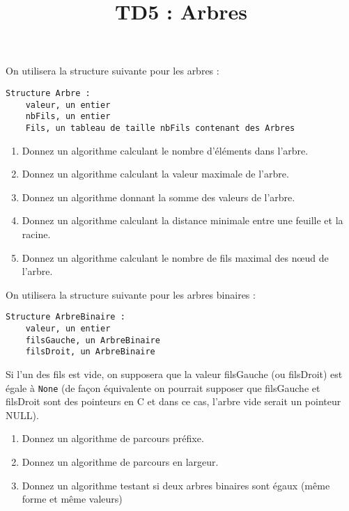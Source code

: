 \documentclass{../cours}
\title{TD5 : Arbres}
\begin{document}
\maketitle


\begin{exercice}[Arbres]

On utilisera la structure suivante pour les arbres :

\begin{lstlisting}
Structure Arbre :
    valeur, un entier
    nbFils, un entier
    Fils, un tableau de taille nbFils contenant des Arbres
\end{lstlisting}

\begin{enumerate}
\item Donnez un algorithme calculant le nombre d'éléments dans l'arbre.
\item Donnez un algorithme calculant la valeur maximale de l'arbre.
\item Donnez un algorithme donnant la somme des valeurs de l'arbre.
\item Donnez un algorithme calculant la distance minimale entre une feuille et la racine.
\item Donnez un algorithme calculant le nombre de fils maximal des nœud de l'arbre.
\end{enumerate}

\end{exercice}

\begin{exercice}

On utilisera la structure suivante pour les arbres binaires :

\begin{lstlisting}
Structure ArbreBinaire :
    valeur, un entier
    filsGauche, un ArbreBinaire
    filsDroit, un ArbreBinaire
\end{lstlisting}

Si l'un des fils est vide, on supposera que la valeur filsGauche (ou filsDroit) est égale à \texttt{None} (de façon équivalente on pourrait supposer que filsGauche et filsDroit sont des pointeurs en C et dans ce cas, l'arbre vide serait un pointeur NULL).

\begin{enumerate}
\item Donnez un algorithme de parcours préfixe.
\item Donnez un algorithme de parcours en largeur.
\item Donnez un algorithme testant si deux arbres binaires sont égaux (même forme et même valeurs)
\end{enumerate}
\end{exercice}
\end{document}

